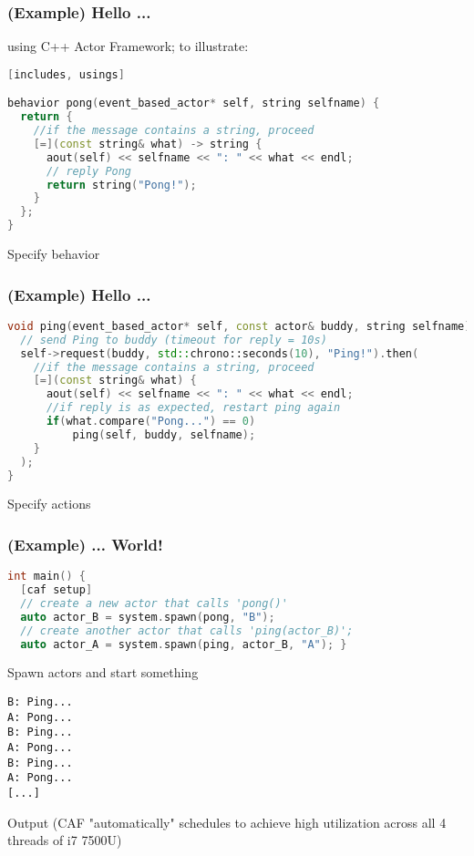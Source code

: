 \begin{frame}[fragile]
\frametitle{(Example) Hello ...}
using C++ Actor Framework; to illustrate:
\begin{lstlisting}[language=C++, caption=sample code, frame=single, breaklines]
[includes, usings]

behavior pong(event_based_actor* self, string selfname) {
  return {
    //if the message contains a string, proceed
    [=](const string& what) -> string {
      aout(self) << selfname << ": " << what << endl;
      // reply Pong
      return string("Pong!");
    }
  };
}
\end{lstlisting}
Specify behavior
\end{frame}

\begin{frame}[fragile]
\frametitle{(Example) Hello ...}
\begin{lstlisting}[language=C++, caption=sample code, frame=single, breaklines]
void ping(event_based_actor* self, const actor& buddy, string selfname) {
  // send Ping to buddy (timeout for reply = 10s)
  self->request(buddy, std::chrono::seconds(10), "Ping!").then(
    //if the message contains a string, proceed
    [=](const string& what) {
      aout(self) << selfname << ": " << what << endl;
	  //if reply is as expected, restart ping again
	  if(what.compare("Pong...") == 0)
		  ping(self, buddy, selfname);
    }
  );
}
\end{lstlisting}
Specify actions
\end{frame}

\begin{frame}[fragile]
\frametitle{(Example) ... World!}
\begin{lstlisting}[language=C++, caption=sample code, frame=single, breaklines]
int main() {
  [caf setup]
  // create a new actor that calls 'pong()'
  auto actor_B = system.spawn(pong, "B");
  // create another actor that calls 'ping(actor_B)';
  auto actor_A = system.spawn(ping, actor_B, "A"); }
\end{lstlisting}
Spawn actors and start something
\begin{lstlisting}[frame=single, breaklines]
B: Ping...
A: Pong...
B: Ping...
A: Pong...
B: Ping...
A: Pong...
[...]
\end{lstlisting}
Output (CAF "automatically" schedules to achieve high utilization across all 4 threads of i7 7500U)
\end{frame}